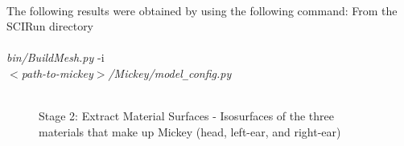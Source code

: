 \documentclass[fleqn,12pt,openany]{book}
\begin{document}
\paragraph{}
The following results were obtained by using the following command:
From the SCIRun directory \\ \\
\emph{bin/BuildMesh.py} -i \\ \emph{$<$path-to-mickey$>$/Mickey/model}\verb+_+\emph{config.py}  \\ \\
\begin{figure}[h!]
\begin{center}
\end{center}
\caption{\label{fig:MickeySurf} Stage 2: Extract Material Surfaces - Isosurfaces of the three materials that make up Mickey (head, left-ear, and right-ear)}
\end{figure} 
\end{document}
